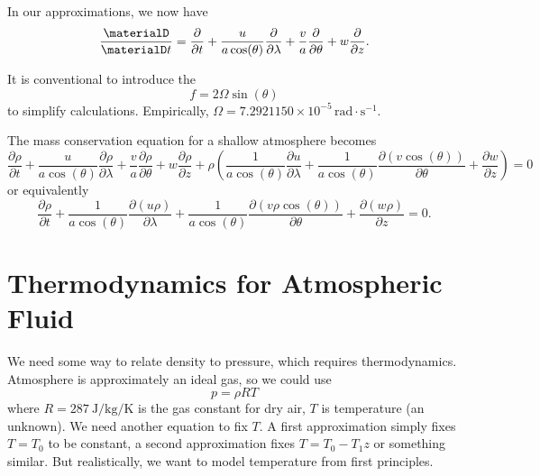 \begin{note}
In our approximations, we now have
\begin{equation}
  \frac{\materialD}{\materialD t}=\frac{\partial}{\partial t} +
  \frac{u}{a\cos(\theta)}\frac{\partial}{\partial\lambda} +
  \frac{v}{a}\frac{\partial}{\partial\theta} + w\frac{\partial}{\partial z}.
\end{equation}
\end{note}

\begin{defn}
It is conventional to introduce the 
\begin{equation}
  f = 2\Omega\sin(\theta)
\end{equation}
to simplify calculations. Empirically, $\Omega=7.2921150\times10^{-5}\,\mathrm{rad}\cdot\mathrm{s}^{-1}$.
\end{defn}


\begin{prop}
The mass conservation equation for a shallow atmosphere becomes
\begin{equation}
  \frac{\partial\rho}{\partial t}
  + \frac{u}{a\cos(\theta)}\frac{\partial\rho}{\partial\lambda}
  + \frac{v}{a}\frac{\partial\rho}{\partial\theta}
  + w\frac{\partial\rho}{\partial z}
  + \rho\left(\frac{1}{a\cos(\theta)}\frac{\partial u}{\partial\lambda}
              + \frac{1}{a\cos(\theta)}\frac{\partial(v\cos(\theta))}{\partial\theta}
              + \frac{\partial w}{\partial z}
       \right)
  = 0
\end{equation}
or equivalently
\begin{equation}
  \frac{\partial\rho}{\partial t}
  + \frac{1}{a\cos(\theta)}\frac{\partial(u\rho)}{\partial\lambda}
  + \frac{1}{a\cos(\theta)}\frac{\partial(v\rho\cos(\theta))}{\partial\theta}
  + \frac{\partial(w\rho)}{\partial z}
  = 0.
\end{equation}
\end{prop}

\section{Thermodynamics for Atmospheric Fluid}
We need some way to relate density to pressure, which requires
thermodynamics. Atmosphere is approximately an ideal gas, so we could
use
\begin{equation}
  p = \rho R T
\end{equation}
where $R=\SI{287}{\joule\per\kilogram\per\kelvin}$ is the gas
constant for dry air, $T$ is temperature (an unknown). We need another
equation to fix $T$. A first approximation simply fixes $T=T_{0}$ to be
constant, a second approximation fixes $T=T_{0}-T_{1}z$ or something
similar. But realistically, we want to model temperature from first
principles.

